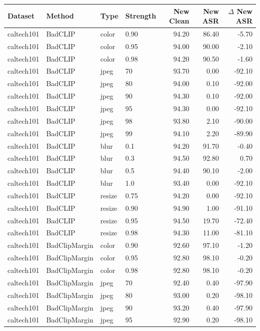 \begin{tabular}{llllrrr}
\hline
Dataset & Method & Type & Strength & New Clean & New ASR & $\Delta$ New ASR \\
\hline
caltech101 & BadCLIP & color & 0.90 & 94.20 & 86.40 & -5.70 \\
caltech101 & BadCLIP & color & 0.95 & 94.00 & 90.00 & -2.10 \\
caltech101 & BadCLIP & color & 0.98 & 94.20 & 90.50 & -1.60 \\
caltech101 & BadCLIP & jpeg & 70 & 93.70 & 0.00 & -92.10 \\
caltech101 & BadCLIP & jpeg & 80 & 94.00 & 0.10 & -92.00 \\
caltech101 & BadCLIP & jpeg & 90 & 94.30 & 0.10 & -92.00 \\
caltech101 & BadCLIP & jpeg & 95 & 94.30 & 0.00 & -92.10 \\
caltech101 & BadCLIP & jpeg & 98 & 93.80 & 2.10 & -90.00 \\
caltech101 & BadCLIP & jpeg & 99 & 94.10 & 2.20 & -89.90 \\
caltech101 & BadCLIP & blur & 0.1 & 94.20 & 91.70 & -0.40 \\
caltech101 & BadCLIP & blur & 0.3 & 94.50 & 92.80 & 0.70 \\
caltech101 & BadCLIP & blur & 0.5 & 94.40 & 90.10 & -2.00 \\
caltech101 & BadCLIP & blur & 1.0 & 93.40 & 0.00 & -92.10 \\
caltech101 & BadCLIP & resize & 0.75 & 94.20 & 0.00 & -92.10 \\
caltech101 & BadCLIP & resize & 0.90 & 94.90 & 1.00 & -91.10 \\
caltech101 & BadCLIP & resize & 0.95 & 94.50 & 19.70 & -72.40 \\
caltech101 & BadCLIP & resize & 0.98 & 94.30 & 11.00 & -81.10 \\
caltech101 & BadClipMargin & color & 0.90 & 92.60 & 97.10 & -1.20 \\
caltech101 & BadClipMargin & color & 0.95 & 92.80 & 98.10 & -0.20 \\
caltech101 & BadClipMargin & color & 0.98 & 92.80 & 98.10 & -0.20 \\
caltech101 & BadClipMargin & jpeg & 70 & 92.40 & 0.40 & -97.90 \\
caltech101 & BadClipMargin & jpeg & 80 & 93.00 & 0.20 & -98.10 \\
caltech101 & BadClipMargin & jpeg & 90 & 93.20 & 0.40 & -97.90 \\
caltech101 & BadClipMargin & jpeg & 95 & 92.90 & 0.20 & -98.10 \\

\end{tabular}
